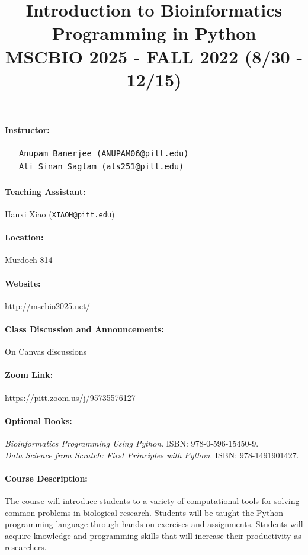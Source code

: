 \documentclass[11pt,letterpaper,oneside]{article}
\title{\bf \large \vspace{-.5in} Introduction to Bioinformatics Programming in Python\\MSCBIO 2025 - FALL 2022 (8/30 - 12/15)}
\author{}
\date{}
\begin{document}
\maketitle
\vspace{-.5in}
\thispagestyle{empty}
\vspace{-.25in}

\paragraph*{Instructor:} 
\begin{tabular}[t]{ll}
 & \texttt{Anupam Banerjee (ANUPAM06@pitt.edu)} \\
 & \texttt{Ali Sinan Saglam (als251@pitt.edu)} \\
\end{tabular}

\paragraph*{Teaching Assistant:} Hanxi Xiao (\texttt{XIAOH@pitt.edu})
\paragraph*{Location:} Murdoch 814
\paragraph*{Website:} \url{http://mscbio2025.net/}
\paragraph*{Class Discussion and Announcements:} On Canvas discussions
\paragraph*{Zoom Link:} \url{https://pitt.zoom.us/j/95735576127}
\paragraph*{Optional Books:} {\it Bioinformatics Programming Using Python}.  ISBN: 978-0-596-15450-9. \\
{\it Data Science from Scratch: First Principles with Python}. ISBN: 978-1491901427.

\paragraph*{Course Description:}
The course will introduce students to a variety of computational tools for solving common problems in biological research. Students will be taught the Python programming language through hands on exercises and assignments. Students will acquire knowledge and programming skills that will increase their productivity as researchers.
\end{document}
